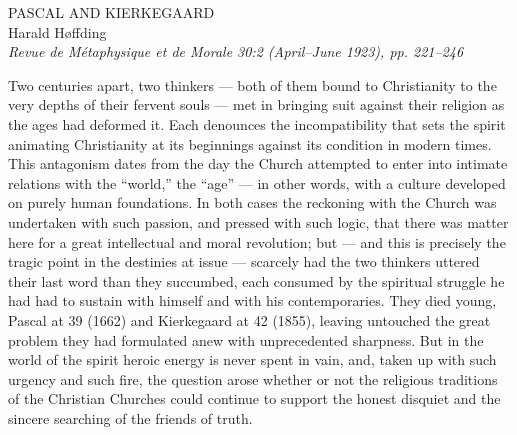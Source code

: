 \documentclass[12pt,a4paper]{article}
\newcommand{\opage}[1]{\marginnote{\footnotesize\textit{[#1]}}}
\begin{document}
\begin{center}
  {\Large PASCAL AND KIERKEGAARD}\\[1ex]
  {\normalsize Harald Høffding}\\[0.5ex]
  {\footnotesize\itshape Revue de Métaphysique et de Morale 30:2
   (April--June 1923), pp. 221--246}
\end{center}

\bigskip


\opage{221}Two centuries apart, two thinkers --- both of them bound to Christianity to
the very depths of their fervent souls --- met in bringing suit against their
religion as the ages had deformed it. Each denounces the incompatibility that
sets the spirit animating Christianity at its beginnings against its condition
in modern times. This antagonism dates from the day the Church attempted to
enter into intimate relations with the ``world,'' the ``age'' --- in other
words, with a culture developed on purely human foundations. In both cases the
reckoning with the Church was undertaken with such passion, and pressed with
such logic, that there was matter here for a great intellectual and moral
revolution; but --- and this is precisely the tragic point in the destinies at
issue --- scarcely had the two thinkers uttered their last word than they
succumbed, each consumed by the spiritual struggle he had had to sustain with
himself and with his contemporaries. They died young, Pascal at 39 (1662) and
Kierkegaard at 42 (1855), leaving untouched the great problem they had
formulated anew with unprecedented sharpness. But in the world of the spirit
heroic energy is never spent in vain, and, taken up with such urgency and such
fire, the question arose whether or not the religious traditions of the
Christian Churches could continue to support the honest disquiet and the
sincere searching of the friends of truth.
\end{document}
